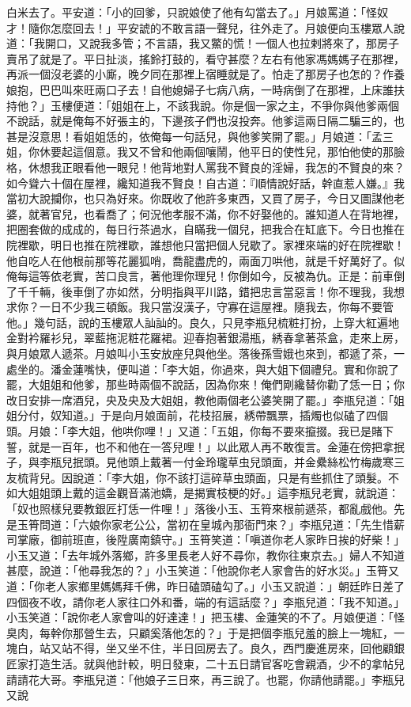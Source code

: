 \begin{showcontents}{}
白米去了。平安道：「小的回爹，只說娘使了他有勾當去了。」月娘罵道：「怪奴才！隨你怎麼回去！」平安諕的不敢言語一聲兒，往外走了。月娘便向玉樓眾人說道：「我開口，又說我多管；不言語，我又鱉的慌！一個人也拉剌將來了，那房子賣吊了就是了。平日扯淡，搖鈴打鼓的，看守甚麼？左右有他家馮媽媽子在那裡，再派一個沒老婆的小廝，晚夕同在那裡上宿睡就是了。怕走了那房子也怎的？作養娘抱，巴巴叫來旺兩口子去！自他媳婦子七病八病，一時病倒了在那裡，上床誰扶持他？」玉樓便道：「姐姐在上，不該我說。你是個一家之主，不爭你與他爹兩個不說話，就是俺每不好張主的，下邊孩子們也沒投奔。他爹這兩日隔二騙三的，也甚是沒意思！看姐姐恁的，依俺每一句話兒，與他爹笑開了罷。」月娘道：「孟三姐，你休要起這個意。我又不曾和他兩個嚷鬧，他平日的使性兒，那怕他使的那臉格，休想我正眼看他一眼兒！他背地對人罵我不賢良的淫婦，我怎的不賢良的來？如今聳六十個在屋裡，纔知道我不賢良！自古道：『順情說好話，幹直惹人嫌。』我當初大說攔你，也只為好來。你既收了他許多東西，又買了房子，今日又圖謀他老婆，就著官兒，也看喬了；何況他孝服不滿，你不好娶他的。誰知道人在背地裡，把圈套做的成成的，每日行茶過水，自瞞我一個兒，把我合在缸底下。今日也推在院裡歇，明日也推在院裡歇，誰想他只當把個人兒歇了。家裡來端的好在院裡歇！他自吃人在他根前那等花麗狐哨，喬龍盡虎的，兩面刀哄他，就是千好萬好了。似俺每這等依老實，苦口良言，著他理你理兒！你倒如今，反被為仇。正是：前車倒了千千輛，後車倒了亦如然，分明指與平川路，錯把忠言當惡言！你不理我，我想求你？一日不少我三頓飯。我只當沒漢子，守寡在這屋裡。隨我去，你每不要管他。」幾句話，說的玉樓眾人訕訕的。良久，只見李瓶兒梳粧打扮，上穿大紅遍地金對衿羅衫兒，翠藍拖泥粧花羅裙。迎春抱著銀湯瓶，綉春拿著茶盒，走來上房，與月娘眾人遞茶。月娘叫小玉安放座兒與他坐。落後孫雪娥也來到，都遞了茶，一處坐的。潘金蓮嘴快，便叫道：「李大姐，你過來，與大姐下個禮兒。實和你說了罷，大姐姐和他爹，那些時兩個不說話，因為你來！俺們剛纔替你勸了恁一日；你改日安排一席酒兒，央及央及大姐姐，教他兩個老公婆笑開了罷。」李瓶兒道：「姐姐分付，奴知道。」于是向月娘面前，花枝招展，綉帶飄票，插燭也似磕了四個頭。月娘：「李大姐，他哄你哩！」又道：「五姐，你每不要來攛掇。我已是賭下誓，就是一百年，也不和他在一答兒哩！」以此眾人再不敢復言。金蓮在傍把拿抿子，與李瓶兒抿頭。見他頭上戴著一付金玲瓏草虫兒頭面，并金纍絲松竹梅歲寒三友梳背兒。因說道：「李大姐，你不該打這碎草虫頭面，只是有些抓住了頭髮。不如大姐姐頭上戴的這金觀音滿池嬌，是揭實枝梗的好。」這李瓶兒老實，就說道：「奴也照樣兒要教銀匠打恁一件哩！」落後小玉、玉筲來根前遞茶，都亂戲他。先是玉筲問道：「六娘你家老公公，當初在皇城內那衙門來？」李瓶兒道：「先生惜薪司掌廠，御前班直，後陞廣南鎮守。」玉筲笑道：「嗔道你老人家昨日挨的好柴！」小玉又道：「去年城外落鄉，許多里長老人好不尋你，教你往東京去。」婦人不知道甚麼，說道：「他尋我怎的？」小玉笑道：「他說你老人家會告的好水災。」玉筲又道：「你老人家鄉里媽媽拜千佛，昨日磕頭磕勾了。」小玉又說道：」朝廷昨日差了四個夜不收，請你老人家往口外和番，端的有這話麼？」李瓶兒道：「我不知道。」小玉笑道：「說你老人家會叫的好達達！」把玉樓、金蓮笑的不了。月娘便道：「怪臭肉，每幹你那營生去，只顧奚落他怎的？」于是把個李瓶兒羞的臉上一塊紅，一塊白，站又站不得，坐又坐不住，半日回房去了。良久，西門慶進房來，回他顧銀匠家打造生活。就與他計較，明日發柬，二十五日請官客吃會親酒，少不的拿帖兒請請花大哥。李瓶兒道：「他娘子三日來，再三說了。也罷，你請他請罷。」李瓶兒又說
\end{showcontents}
